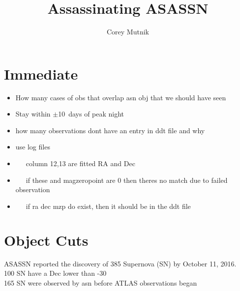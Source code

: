 \documentclass[aps,prb,twocolumn,superscriptaddress]{revtex4-1}
\begin{document}
\title{Assassinating ASASSN}


\author{Corey Mutnik}

\begin{abstract}

\end{abstract}

\maketitle    




\section{Immediate}
\begin{itemize}
	\item{} How many cases of obs that overlap asn obj that we should have seen
	\item{} Stay within $\pm$10~days of peak night
	\item{} how many observations dont have an entry in ddt file and why
	\item{} use log files
	\item{} ~~~column 12,13 are fitted RA and Dec
	\item{} ~~~if these and magzeropoint are 0 then theres no match due to failed observation
	\item{} ~~~if ra dec mzp do exist, then it should be in the ddt file
\end{itemize}


\section{Object Cuts}

\iffalse
 ASASSN reported the discovery of 385 Supernova (SN) by October 11, 2016. \\
 100 SN have a Dec lower than -30\\
 165 SN were observed by asn before ATLAS observations began\\
\end{document}
